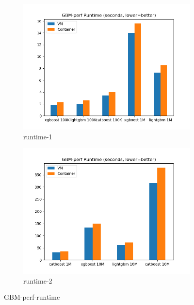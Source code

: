 \documentclass[11pt]{article}
\begin{document}
\begin{figure}[hbt!]
  \centering
  \begin{subfigure}{.5\textwidth}
    \centering
    \includegraphics[width=1.1\linewidth]{gbmperf_runtime_1.png}
    \caption{runtime-1}
    \label{fig:gbmperfr1}
  \end{subfigure}%
  \begin{subfigure}{.5\textwidth}
    \centering
    \includegraphics[width=1.1\linewidth]{gbmperf_runtime_2.png}
    \caption{runtime-2}
    \label{fig:gbmperfr2}
  \end{subfigure}
  \caption{GBM-perf-runtime}
  \label{fig:rubis}
\end{figure}
\end{document}
